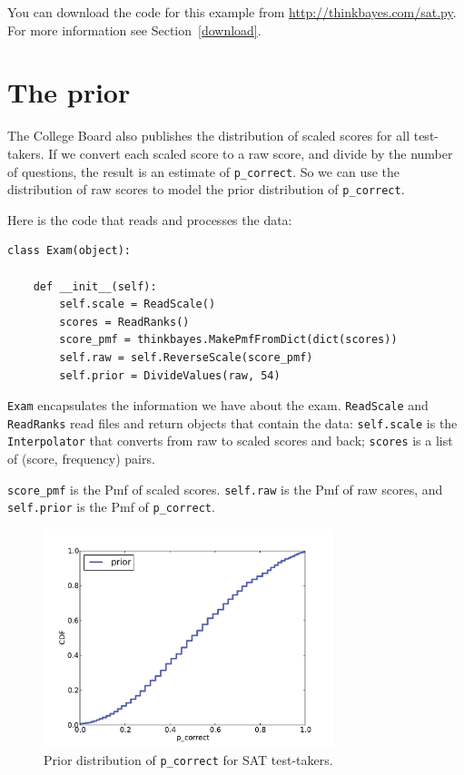 \documentclass[12pt]{book}
\begin{document}
You can download the code for this example from
\url{http://thinkbayes.com/sat.py}.
  For more information
see Section~\ref{download}.

\section{The prior}

The College Board also publishes the distribution of scaled scores
for all test-takers.  If we convert each scaled score to a raw score,
and divide by the number of questions, the result is an estimate
of \verb"p_correct".
So we can use the distribution of raw scores to model the
prior distribution of \verb"p_correct".

Here is the code that reads and processes the data:

\begin{verbatim}
class Exam(object):

    def __init__(self):
        self.scale = ReadScale()
        scores = ReadRanks()
        score_pmf = thinkbayes.MakePmfFromDict(dict(scores))
        self.raw = self.ReverseScale(score_pmf)
        self.prior = DivideValues(raw, 54)
\end{verbatim}

{\tt Exam} encapsulates the information we have about the exam.
{\tt ReadScale} and {\tt ReadRanks} read files and return
objects that contain the data:
{\tt self.scale} is the {\tt Interpolator} that converts
from raw to scaled scores and back;  {\tt scores} is a list
of (score, frequency) pairs.

\verb"score_pmf" is the Pmf of
scaled scores.   {\tt self.raw} is the Pmf of raw scores, and
{\tt self.prior} is the Pmf of \verb"p_correct".

\begin{figure}
\centerline{\includegraphics[height=2.5in]{figs/sat_prior.pdf}}
\caption{Prior distribution of {\tt p\_correct} for SAT test-takers.}
\label{fig.satprior}
\end{figure}
\end{document}

